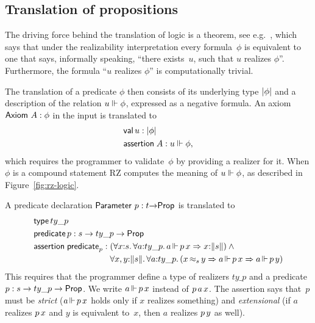 \subsection{Translation of propositions}
\label{sec:transl-prop}

The driving force behind the translation of logic is a theorem, see
e.g.\ \cite[Thm.~4.4.10]{Troelstra:van-Dalen:88:1}, which says that
under the realizability interpretation every formula~$\phi$ is
equivalent to one that says, informally speaking, ``there exists~$u$,
such that $u$ realizes $\phi$''. Furthermore, the formula ``$u$
realizes $\phi$'' is computationally trivial.

The translation of a predicate $\phi$ then consists of its underlying
type $|\phi|$ and a description of the relation $u \Vdash \phi$,
expressed as a negative formula. An axiom $\mathsf{Axiom}\ A : \phi$ in the
input is translated to
%
\begin{align*}
  & \mathsf{val}\,u:|\phi| \\
  & \mathsf{assertion}\; A : u \Vdash \phi,
\end{align*}
%
which requires the programmer to validate~$\phi$ by providing a
realizer for it. When $\phi$ is a compound statement RZ computes the
meaning of $u \Vdash \phi$, as described in Figure~\ref{fig:rz-logic}.

A predicate declaration $\mathsf{Parameter}\ p : t{\to}\mathsf{Prop}$ is
translated to
%
\begin{align*}
  & \otyspec{ty\_p} \\
  & \opropspec{p}{s \to ty\_p \to \oProp} \\
  & \oassertion{\mathsf{predicate}_p}{
    \begin{aligned}[t]
      & (\oforall{x}{s}{\oforall{a}{ty\_p}{
          \oimply
          {\orz{a}{\oapp{p}{x}}}
          {\ototal{x}{s}}
        }}) \land {} \\
      & \oforallt{x,y}{s}{\oforall{a}{ty\_p}{
          (\oimply{\oper{s}{x}{y}}
          {\oimply{\orz{a}{\oapp{p}{x}}}{\orz{a}{\oapp{p}{y}}}})
          }}
    \end{aligned}
    }
\end{align*}
%
This requires that the programmer define a type of realizers $ty\_p$
and a predicate $p : s \to ty\_p \to \mathsf{Prop}$. We write
$a\,{\Vdash}\,p\,x$ instead of $p\,a\,x$. The
assertion says that~$p$ must be \emph{strict} ($a\,{\Vdash}\,p\,x$
holds only if $x$ realizes something) and \emph{extensional} (if $a$
realizes $p\,x$ and $y$ is equivalent to~$x$, then $a$ realizes
$p\,y$ as well).

